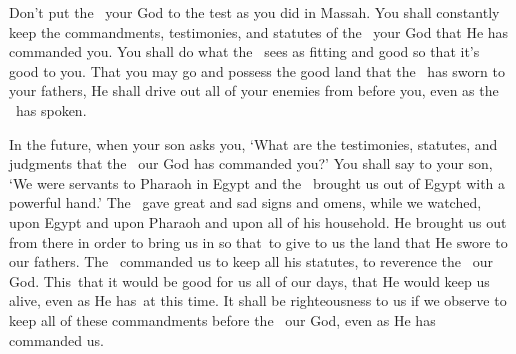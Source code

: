 \begin{inparaenum}
   Don't put the \lord\ your God to the test as you did in Massah.%
   You shall constantly keep the commandments, testimonies, and statutes of the \lord\ your God that He has commanded you.%
   You shall do what the \lord\ sees as fitting and good so that it's good to you. That you may go and possess the good land that the \lord\ has sworn to your fathers,%
   He shall drive out all of your enemies from before you, even as the \lord\ has spoken.%
  
   In the future, when your son asks you, `What are the testimonies, statutes, and judgments that the \lord\ our God has commanded you?'%
   You shall say to your son, `We were servants to Pharaoh in Egypt and the \lord\ brought us out of Egypt with a powerful hand.'%
   The \lord\ gave great and sad signs and omens, while we watched, upon Egypt and upon Pharaoh and upon all of his household.%
   He brought us out from there in order to bring us in so that\understood\ to give to us the land that He swore to our fathers.%
   The \lord\ commanded us to keep all his statutes, to reverence the \lord\ our God. This\understood\ that it would be good for us all of our days, that He would keep us alive, even as He has\understood\ at this time.%
   It shall be righteousness to us if we observe to keep all of these commandments before the \lord\ our God, even as He has commanded us.%
\end{inparaenum}
